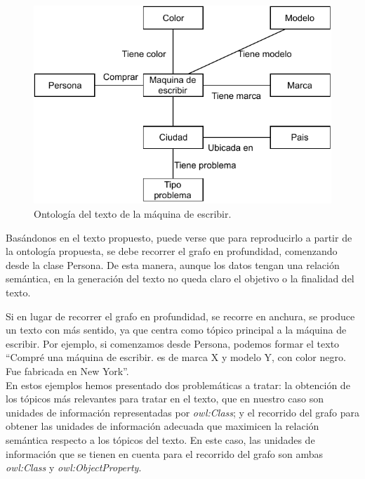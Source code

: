 \begin{figure}
    \centering
    \includegraphics[scale=0.65]{img/presentacion_problema/onto_maq_escr.pdf}
    \caption{Ontología del texto de la máquina de escribir.}
    \label{fig:maquina_escr}
\end{figure}

Basándonos en el texto propuesto, puede verse que para reproducirlo a partir de la ontología propuesta, se debe recorrer el grafo en profundidad, comenzando desde la clase Persona. De esta manera, aunque los datos tengan una relación semántica, en la generación del texto no queda claro el objetivo o la finalidad del texto. 

Si en lugar de recorrer el grafo en profundidad, se recorre en anchura, se produce un texto con más sentido, ya que centra como tópico principal a la máquina de escribir. Por ejemplo, si comenzamos desde Persona, podemos formar el texto ``Compré una máquina de escribir. es de marca X y modelo Y, con color negro. Fue fabricada en New York''.
\\

En estos ejemplos hemos presentado dos problemáticas a tratar: la obtención de los tópicos más relevantes para tratar en el texto, que en nuestro caso son unidades de información representadas por \emph{owl:Class}; y el recorrido del grafo para obtener las unidades de información adecuada que maximicen la relación semántica respecto a los tópicos del texto. En este caso, las unidades de información que se tienen en cuenta para el recorrido del grafo son ambas \emph{owl:Class} y \emph{owl:ObjectProperty}.
 
